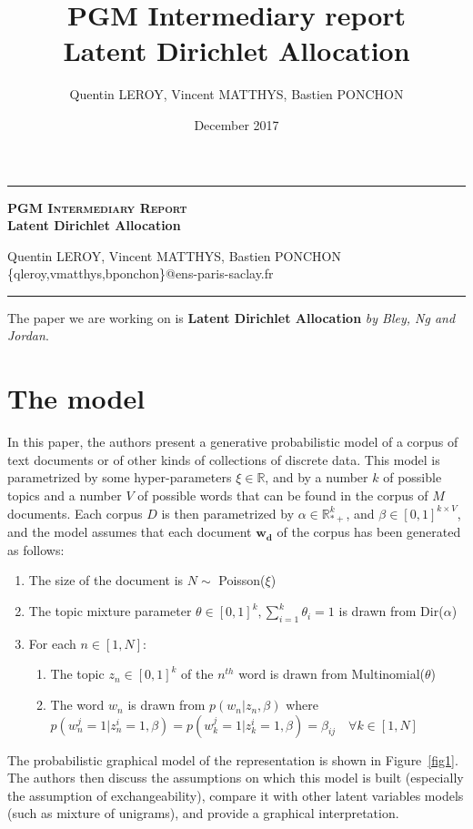\documentclass[12pt,a4paper,onecolumn]{article}
\title{PGM Intermediary report \\ Latent Dirichlet Allocation}
\author{Quentin LEROY, Vincent MATTHYS, Bastien PONCHON}
\date{December 2017}
\begin{document}
\begin{center}

	\rule[11pt]{5cm}{0.5pt}

	\textbf{\Large \textsc{PGM Intermediary Report} \\ Latent Dirichlet Allocation}
	\vspace{0.5cm}

	Quentin LEROY, Vincent MATTHYS, Bastien PONCHON\\
	\{qleroy,vmatthys,bponchon\}@ens-paris-saclay.fr

	\rule{5cm}{0.5pt}

	\vspace{1cm}
\end{center}


The paper we are working on is \textbf{Latent Dirichlet Allocation} \textit{by Bley, Ng and Jordan}.

\section{The model}

In this paper, the authors present a generative probabilistic model of a corpus of text documents or of other kinds of collections of discrete data. This model is parametrized by some hyper-parameters $\xi \in \mathbb{R}$, and by a number $k$ of possible topics and a number $V$ of possible words that can be found in the corpus of $M$ documents.  Each corpus $D$ is then parametrized by $\alpha \in \mathbb{R}_{*+}^{k} $, and $\beta \in [0,1]^{k \times V}$, and the model assumes that each document $\bm{w_d}$ of the corpus has been generated as follows:
\begin{enumerate}
	\item The size of the document is $N \sim$ Poisson($\xi$)
	\item The topic mixture parameter $\theta \in [0,1]^{k}, \sum_{i = 1}^{k}\theta_i = 1$ is drawn from Dir($\alpha$)
	\item For each $n \in [1, N]$:
	      \begin{enumerate}
		      \item The topic $z_n \in [0,1]^k$ of the $n^{th}$ word is drawn from Multinomial($\theta$)
		      \item The word $w_n$ is drawn from $p(w_n|z_n, \beta)$ where $p(w_n^j=1|z_n^i=1, \beta) = p(w_k^j=1|z_k^i=1, \beta) = \beta_{ij} \quad \forall k \in [1, N]$
	      \end{enumerate}

\end{enumerate}
The probabilistic graphical model of the representation is shown in Figure~\ref{fig1}. The authors then discuss the assumptions on which this model is built (especially the assumption of exchangeability), compare it with other latent variables models (such as mixture of unigrams), and provide a graphical interpretation.
\end{document}
